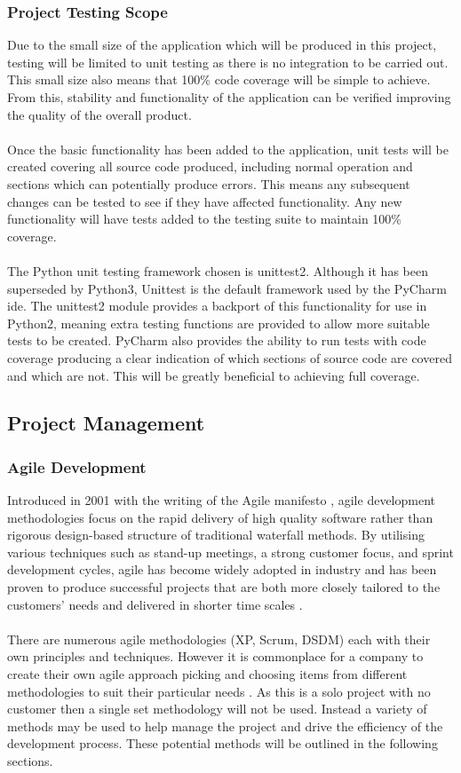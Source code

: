 	\subsubsection{Project Testing Scope}\label{sec:project_testing_scope}
		Due to the small size of the application which will be produced in this project, testing will be limited to unit testing as there is no integration to be carried out. This small size also means that 100\% code coverage will be simple to achieve. From this, stability and functionality of the application can be verified improving the quality of the overall product.
		\\\\
		Once the basic functionality has been added to the application, unit tests will be created covering all source code produced, including normal operation and sections which can potentially produce errors. This means any subsequent changes can be tested to see if they have affected functionality. Any new functionality will have tests added to the testing suite to maintain 100\% coverage.
		\\\\
		The Python unit testing framework chosen is unittest2. Although it has been superseded by Python3, Unittest is the default framework used by the PyCharm \gls{ide}. The unittest2 module provides a backport of this functionality for use in Python2, meaning extra testing functions are provided to allow more suitable tests to be created. PyCharm also provides the ability to run tests with code coverage producing a clear indication of which sections of source code are covered and which are not. This will be greatly beneficial to achieving full coverage.
\subsection{Project Management}\label{sec:project_management}
	\subsubsection{Agile Development}
		Introduced in 2001 with the writing of the Agile manifesto \citep{beck2001manifesto}, agile development methodologies focus on the rapid delivery of high quality software rather than rigorous design-based structure of traditional waterfall methods. By utilising various techniques such as stand-up meetings, a strong customer focus, and sprint development cycles, agile has become widely adopted in industry and has been proven to produce successful projects that are both more closely tailored to the customers’ needs and delivered in shorter time scales \citep{state_of_agile_2015}.
		\\\\
		There are numerous agile methodologies (XP, Scrum, DSDM) each with their own principles and techniques. However it is commonplace for a company to create their own agile approach picking and choosing items from different methodologies to suit their particular needs \citep{aydin2004agile}. As this is a solo project with no customer then a single set methodology will not be used. Instead a variety of methods may be used to help manage the project and drive the efficiency of the development process. These potential methods will be outlined in the following sections.
